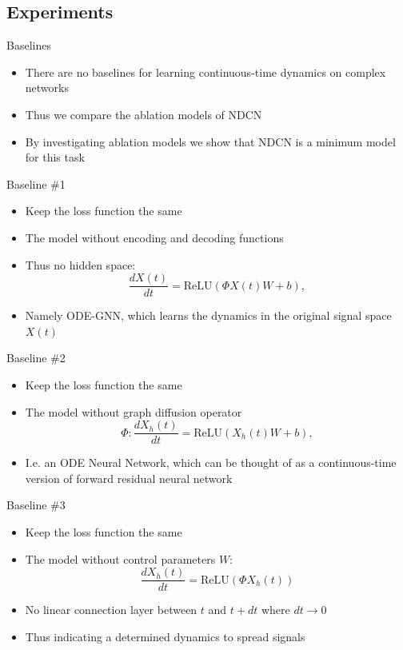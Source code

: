 \documentclass{beamer}
\begin{document}
\subsection{Experiments}
\begin{frame}{Baselines}
\begin{itemize}
\item There are no baselines for learning continuous-time dynamics on complex networks
\item Thus we compare the ablation models of NDCN
\item By investigating ablation models we show that NDCN is a minimum model for this task
\end{itemize}
\end{frame}

\begin{frame}{Baseline \#1}
\begin{itemize}
\item Keep the loss function the same
\item The model without encoding and decoding functions
\item Thus no hidden space:\[
\frac{dX(t)}{dt}=\text{ReLU}(\Phi X(t)W+b),
\]
\item Namely ODE-GNN, which learns the dynamics in the original signal space $X(t)$
\end{itemize}
\end{frame}

\begin{frame}{Baseline \#2}
\begin{itemize}
\item Keep the loss function the same
\item The model without graph diffusion operator\[
\Phi: \frac{dX_h(t)}{dt}=\text{ReLU}(X_h(t)W+b),
\]
\item I.e. an ODE Neural Network, which can be thought of as a continuous-time version of forward residual neural network
\end{itemize}
\end{frame}

\begin{frame}{Baseline \#3}
\begin{itemize}
\item Keep the loss function the same
\item The model without control parameters $W$:\[
\frac{dX_h(t)}{dt}=\text{ReLU}(\Phi X_h(t))
\]
\item No linear connection layer between $t$ and $t+dt$ where $dt\to 0$
\item Thus indicating a determined dynamics to spread signals
\end{itemize}
\end{frame}
\end{document}
